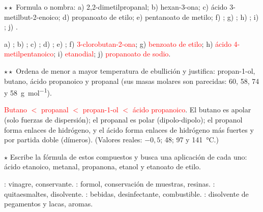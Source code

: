 \begin{exercise}
    \(\star\star\) Formula o nombra: a) 2,2-dimetilpropanal; b) hexan-3-ona; c) ácido 3-metilbut-2-enoico; d) propanoato de etilo;
    e) pentanoato de metilo; f) ; g) ; h) ;
    i) ; j) .
    \begin{solu}
        a) \textcolor{red}{}; b) \textcolor{red}{};
        c) \textcolor{red}{}; d) \textcolor{red}{};
        e) \textcolor{red}{}; f) \textcolor{red}{3-clorobutan-2-ona}; g) \textcolor{red}{benzoato de etilo};
        h) \textcolor{red}{ácido 4-metilpentanoico}; i) \textcolor{red}{etanodial}; j) \textcolor{red}{propanoato de sodio}.
    \end{solu}
\end{exercise}

\begin{exercise}
    \(\star\star\) Ordena de menor a mayor temperatura de ebullición y justifica: propan-1-ol, butano, ácido propanoico y propanal
    (sus masas molares son parecidas: 60, 58, 74 y \qty{58}{\gram\per\mol}).
    \begin{solu}
        \textcolor{red}{Butano \(<\) propanal \(<\) propan-1-ol \(<\) ácido propanoico}. El butano es apolar (solo fuerzas de
        dispersión); el propanal es polar (dipolo-dipolo); el propanol forma enlaces de hidrógeno, y el ácido forma enlaces de
        hidrógeno más fuertes y por partida doble (dímeros). (Valores reales: \(-0{,}5\); 48; 97 y \qty{141}{\degreeCelsius}.)
    \end{solu}
\end{exercise}

\begin{exercise}
    \(\star\) Escribe la fórmula de estos compuestos y busca una aplicación de cada uno: ácido etanoico, metanal, propanona,
    etanol y etanoato de etilo.
    \begin{solu}
        \textcolor{red}{}: vinagre, conservante. \textcolor{red}{}: formol, conservación de muestras,
        resinas. \textcolor{red}{}: quitaesmaltes, disolvente. \textcolor{red}{}: bebidas,
        desinfectante, combustible. \textcolor{red}{}: disolvente de pegamentos y lacas, aromas.
    \end{solu}
\end{exercise}

